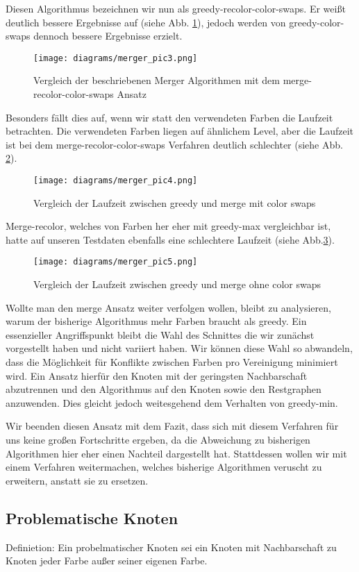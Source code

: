 \documentclass[11pt]{article}
\begin{document}
Diesen Algorithmus bezeichnen wir nun als greedy-recolor-color-swaps.
Er weißt deutlich bessere Ergebnisse auf (siehe Abb. \ref{fig:merge3}), jedoch werden von greedy-color-swaps dennoch bessere Ergebnisse erzielt.
\begin{figure}
  \texttt{[image: diagrams/merger\_pic3.png]}
  \caption{Vergleich der beschriebenen Merger Algorithmen mit dem merge-recolor-color-swaps Ansatz}
  \label{fig:merge3}
\end{figure}
Besonders fällt dies auf, wenn wir statt den verwendeten Farben die Laufzeit betrachten. Die verwendeten Farben liegen auf ähnlichem Level,
aber die Laufzeit ist bei dem merge-recolor-color-swaps Verfahren deutlich schlechter (siehe Abb. \ref{fig:merge4}).\\
\begin{figure}
  \texttt{[image: diagrams/merger\_pic4.png]}
  \caption{Vergleich der Laufzeit zwischen greedy und merge mit color swaps}
  \label{fig:merge4}
\end{figure}
Merge-recolor, welches von Farben her eher mit greedy-max vergleichbar ist, hatte auf unseren Testdaten ebenfalls eine schlechtere Laufzeit (siehe Abb.\ref{fig:merge5}).
\begin{figure}
  \texttt{[image: diagrams/merger\_pic5.png]}
  \caption{Vergleich der Laufzeit zwischen greedy und merge ohne color swaps}
  \label{fig:merge5}
\end{figure}

Wollte man den merge Ansatz weiter verfolgen wollen, bleibt zu analysieren, warum der bisherige Algorithmus mehr Farben braucht als greedy.
Ein essenzieller Angriffspunkt bleibt die Wahl des Schnittes die wir zunächst vorgestellt haben und nicht variiert haben.
Wir können diese Wahl so abwandeln, dass die Möglichkeit für Konflikte zwischen Farben pro Vereinigung minimiert wird.
Ein Ansatz hierfür den Knoten mit der geringsten Nachbarschaft abzutrennen und den Algorithmus auf den Knoten sowie den Restgraphen anzuwenden.
Dies gleicht jedoch weitesgehend dem Verhalten von greedy-min.

Wir beenden diesen Ansatz mit dem Fazit, dass sich mit diesem Verfahren für uns keine großen Fortschritte ergeben,
da die Abweichung zu bisherigen Algorithmen hier eher einen Nachteil dargestellt hat.
Stattdessen wollen wir mit einem Verfahren weitermachen, welches bisherige Algorithmen veruscht zu erweitern, anstatt sie zu ersetzen.

\subsection{Problematische Knoten}
Definietion: Ein probelmatischer Knoten sei ein Knoten mit Nachbarschaft zu Knoten jeder Farbe außer seiner eigenen Farbe. \\
\end{document}
